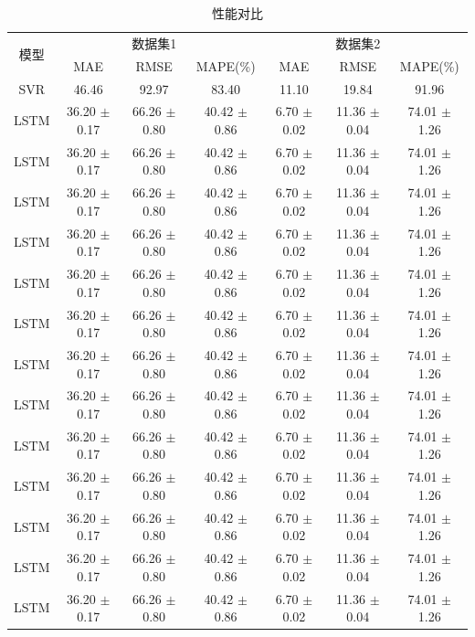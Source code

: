\begin{table}
	\setlength\tabcolsep{20pt} %
	\caption{性能对比}
	\begin{threeparttable}
		\begin{tabular}{c|ccc|ccc}
			\toprule
			\multirow{2}{*}{模型} &  & 数据集1 &  &  & 数据集2&  \\
			& MAE & RMSE & MAPE(\%) & MAE & RMSE & MAPE(\%) \\
			\midrule
			
			SVR & 46.46 & 92.97 & 83.40 & 11.10 & 19.84 & 91.96  \\
			LSTM & 36.20 $\pm$0.17 & 66.26 $\pm$0.80 & 40.42 $\pm$0.86 & 6.70 $\pm$0.02 & 11.36 $\pm$0.04 & 74.01 $\pm$1.26  \\
			LSTM & 36.20 $\pm$0.17 & 66.26 $\pm$0.80 & 40.42 $\pm$0.86 & 6.70 $\pm$0.02 & 11.36 $\pm$0.04 & 74.01 $\pm$1.26  \\
			LSTM & 36.20 $\pm$0.17 & 66.26 $\pm$0.80 & 40.42 $\pm$0.86 & 6.70 $\pm$0.02 & 11.36 $\pm$0.04 & 74.01 $\pm$1.26  \\
			LSTM & 36.20 $\pm$0.17 & 66.26 $\pm$0.80 & 40.42 $\pm$0.86 & 6.70 $\pm$0.02 & 11.36 $\pm$0.04 & 74.01 $\pm$1.26  \\
			LSTM & 36.20 $\pm$0.17 & 66.26 $\pm$0.80 & 40.42 $\pm$0.86 & 6.70 $\pm$0.02 & 11.36 $\pm$0.04 & 74.01 $\pm$1.26  \\
			LSTM & 36.20 $\pm$0.17 & 66.26 $\pm$0.80 & 40.42 $\pm$0.86 & 6.70 $\pm$0.02 & 11.36 $\pm$0.04 & 74.01 $\pm$1.26  \\
			LSTM & 36.20 $\pm$0.17 & 66.26 $\pm$0.80 & 40.42 $\pm$0.86 & 6.70 $\pm$0.02 & 11.36 $\pm$0.04 & 74.01 $\pm$1.26  \\
			LSTM & 36.20 $\pm$0.17 & 66.26 $\pm$0.80 & 40.42 $\pm$0.86 & 6.70 $\pm$0.02 & 11.36 $\pm$0.04 & 74.01 $\pm$1.26  \\
			LSTM & 36.20 $\pm$0.17 & 66.26 $\pm$0.80 & 40.42 $\pm$0.86 & 6.70 $\pm$0.02 & 11.36 $\pm$0.04 & 74.01 $\pm$1.26  \\
			LSTM & 36.20 $\pm$0.17 & 66.26 $\pm$0.80 & 40.42 $\pm$0.86 & 6.70 $\pm$0.02 & 11.36 $\pm$0.04 & 74.01 $\pm$1.26  \\
			LSTM & 36.20 $\pm$0.17 & 66.26 $\pm$0.80 & 40.42 $\pm$0.86 & 6.70 $\pm$0.02 & 11.36 $\pm$0.04 & 74.01 $\pm$1.26  \\		
			LSTM & 36.20 $\pm$0.17 & 66.26 $\pm$0.80 & 40.42 $\pm$0.86 & 6.70 $\pm$0.02 & 11.36 $\pm$0.04 & 74.01 $\pm$1.26  \\
			LSTM & 36.20 $\pm$0.17 & 66.26 $\pm$0.80 & 40.42 $\pm$0.86 & 6.70 $\pm$0.02 & 11.36 $\pm$0.04 & 74.01 $\pm$1.26  \\

\end{tabular}
\end{threeparttable}
\end{table}

